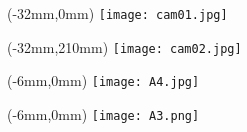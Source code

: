 \documentclass[12pt]{article}
\begin{document}
\begin{textblock*}{350mm}(-32mm,0mm)
	\texttt{[image: cam01.jpg]}
\end{textblock*}

\begin{textblock*}{350mm}(-32mm,210mm)
	\texttt{[image: cam02.jpg]}
\end{textblock*}

\begin{textblock*}{350mm}(-6mm,0mm)%
	\texttt{[image: A4.jpg]}
\end{textblock*}

\begin{textblock*}{350mm}(-6mm,0mm)%
	\texttt{[image: A3.png]}
\end{textblock*}

\TPMargin{3mm}
\end{document}
